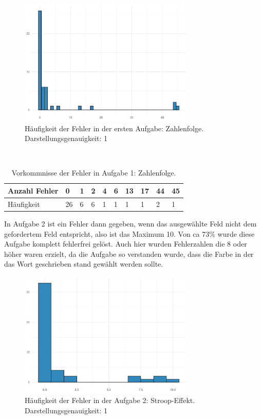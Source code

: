 \begin{figure}[H]
	\centering
	\includegraphics[width=0.75\textwidth]{./_StudyResults/orderingMisHist}
	\caption{Häufigkeit der Fehler in der ersten Aufgabe: Zahlenfolge. Darstellungsgenauigkeit: 1}
	\label{fig:orderingMistakeHistogram}
\end{figure}

\begin{table}
	\caption{Vorkommnisse der Fehler in Aufgabe 1: Zahlenfolge.}~\label{tab:orderingMistakeNumbers}
	
	\setlength\tabcolsep{3pt}
	\renewcommand{\arraystretch}{1.4}%
	\begin{tabularx}{\textwidth}{ | l | x | x | x | x | x | x | x | x | x | }
		\hline
		Anzahl Fehler & 0   & 1  & 2  & 4  & 6  & 13 & 17 & 44  & 45 \\ \hline\hline
		Häufigkeit 	  & 26  & 6  & 6  & 1  & 1  & 1  & 1  &  2  & 1  \\ \hline
	\end{tabularx}
\end{table}

In Aufgabe 2 ist ein Fehler dann gegeben, wenn das ausgewählte Feld nicht dem gefordertem Feld entspricht, also ist das Maximum 10.
Von ca 73\% wurde diese Aufgabe komplett fehlerfrei gelöst.
Auch hier wurden Fehlerzahlen die 8 oder höher waren erzielt, da die Aufgabe so verstanden wurde, dass die Farbe in der das Wort geschrieben stand gewählt werden sollte.

\begin{figure}[H]
	\centering
	\includegraphics[width=0.75\textwidth]{./_StudyResults/matchingMisHist}
	\caption{Häufigkeit der Fehler in der Aufgabe 2: Stroop-Effekt. Darstellungsgenauigkeit: 1}
	\label{fig:matchingMistakeHistogram}
\end{figure}

